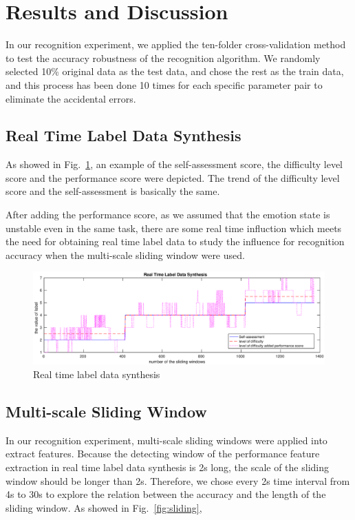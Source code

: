 \documentclass[runningheads,a4paper]{llncs}
\begin{document}
\section{Results and Discussion}
In our recognition experiment, we applied the ten-folder cross-validation method
to test the accuracy robustness of the recognition algorithm. We randomly selected
10\% original data as the test data, and chose the rest as the train data, and this
process has been done 10 times for each specific parameter pair to eliminate the
accidental errors.
\subsection{Real Time Label Data Synthesis }
As showed in Fig.~\ref{fig:label}, an example of the self-assessment score,
the difficulty level score and the performance score were depicted.
The trend of the difficulty level score and the self-assessment is basically
the same.

After adding the performance score, as we assumed that the emotion state
is unstable even in the same task, there are some real time influction which
meets the need for obtaining real time label data to study the influence for recognition
accuracy when the multi-scale sliding window were used.

\begin{figure}
  \includegraphics[width=12cm]{images/16}
  \caption{Real time label data synthesis}
  \label{fig:label}
\end{figure}

\subsection{Multi-scale Sliding Window}
In our recognition experiment, multi-scale sliding windows were applied into
extract features. Because the detecting window of the performance feature extraction
in real time label data synthesis is 2s long, the scale of the sliding window
should be longer than 2s. Therefore, we chose every 2s time interval from 4s to
30s to explore the relation between the accuracy and the length of the sliding
window. As showed in Fig.~\ref{fig:sliding},
\end{document}
